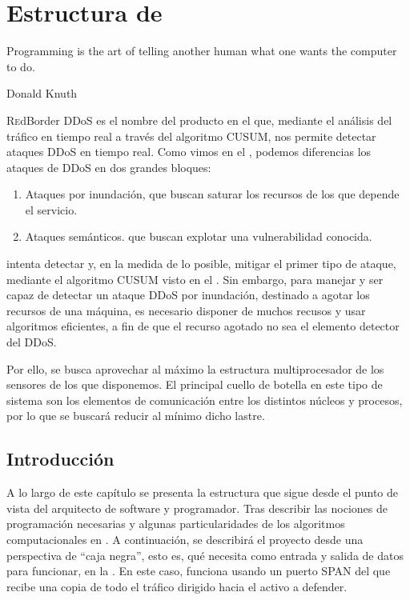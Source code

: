 \chapter{Estructura de \redborderddos}
\pagestyle{esitscCD}
\epigraph{Programming is the art of telling another human what one wants the computer to do.}{Donald Knuth}

\lettrine[lraise=-0.1, lines=2, loversize=0.25]{R}edBorder DDoS es el nombre del producto en el 
que, mediante el análisis del tráfico en tiempo real a través del algoritmo \gls{CUSUM}, nos permite detectar ataques 
\gls{DDoS} en tiempo real. Como vimos en el , podemos diferencias los ataques de 
\gls{DDoS} en dos grandes bloques: 
\begin{enumerate}
 \item Ataques por inundación, que buscan saturar los recursos de los que depende el servicio.
 \item Ataques semánticos. que buscan explotar una vulnerabilidad conocida.
\end{enumerate}

\redborderddos{} intenta detectar y, en la medida de lo posible, mitigar el primer tipo de ataque, mediante el 
algoritmo \gls{CUSUM} visto en el . Sin embargo, para manejar y ser capaz de detectar un ataque 
\gls{DDoS} por inundación, destinado a agotar los recursos de una máquina, es necesario disponer de muchos recusos y 
usar algoritmos eficientes, a fin de que el recurso agotado no sea el elemento detector del \gls{DDoS}.

Por ello, se busca aprovechar al máximo la estructura multiprocesador de los sensores de los que disponemos. El 
principal cuello de botella en este tipo de sistema son los elementos de comunicación entre los distintos núcleos y 
procesos, por lo que se buscará reducir al mínimo dicho lastre.

\section{Introducción}

A lo largo de este capítulo se presenta la estructura que sigue \redborderddos{} desde el punto de vista del arquitecto 
de software y programador. Tras describir las nociones de programación necesarias y algunas particularidades de los 
algoritmos computacionales en . A continuación, se describirá el proyecto desde una perspectiva de 
``caja negra'', esto es, qué necesita como entrada y salida de datos para funcionar, en la . En este 
caso, \redborderddos{} funciona usando un puerto SPAN del que recibe una copia de todo el tráfico dirigido hacia el 
activo a defender.

